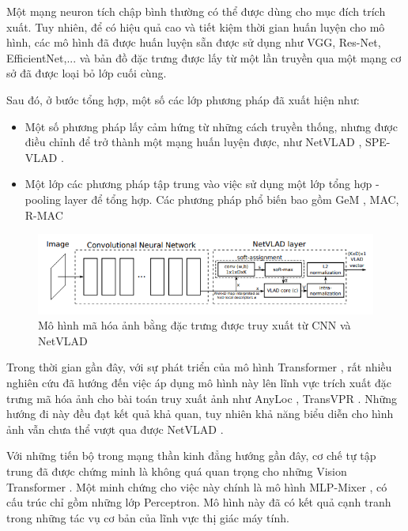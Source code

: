 Một mạng neuron tích chập bình thường có thể được dùng cho mục đích trích xuất. Tuy nhiên, để có hiệu quả cao và tiết kiệm thời gian huấn luyện cho mô hình, các mô hình đã được huấn luyện sẵn được sử dụng như VGG, Res-Net, EfficientNet,... và bản đồ đặc trưng được lấy từ một lần truyền qua một mạng cơ sở đã được loại bỏ lớp cuối cùng.

Sau đó, ở bước tổng hợp, một số các lớp phương pháp đã xuất hiện như:
\begin{itemize}
    \item Một số phương pháp lấy cảm hứng từ những cách truyền thống, nhưng được điều chỉnh để trở thành một mạng huấn luyện được, như NetVLAD \cite{arandjelovic2016netvlad}, SPE-VLAD \cite{yu2019spatial}.
    \item Một lớp các phương pháp tập trung vào việc sử dụng một lớp tổng hợp - pooling layer để tổng hợp. Các phương pháp phổ biến bao gồm GeM \cite{radenovic2018fine}, MAC, R-MAC \cite{tolias2015particular}
\end{itemize}

\begin{figure}[H]
    \centering
    \includegraphics[scale=0.8]{pics/Chapter3/netvlad.png}
    \caption{Mô hình mã hóa ảnh bằng đặc trưng được truy xuất từ CNN và  NetVLAD \cite{arandjelovic2016netvlad}}
    \label{fig:enter-label}
\end{figure}

Trong thời gian gần đây, với sự phát triển của mô hình Transformer \cite{vaswani2023attention}, rất nhiều nghiên cứu đã hướng đến việc áp dụng mô hình này lên lĩnh vực trích xuất đặc trưng mã hóa ảnh cho bài toán truy xuất ảnh như AnyLoc \cite{keetha2023anyloc}, TransVPR \cite{wang2022transvpr}. Những hướng đi này đều đạt kết quả khả quan, tuy nhiên khả năng biểu diễn cho hình ảnh vẫn chưa thể vượt qua được NetVLAD \cite{alibey2023mixvpr}.

Với những tiến bộ trong mạng thần kinh đẳng hướng gần đây, cơ chế tự tập trung đã được chứng minh là không quá quan trọng cho những Vision Transformer \cite{dosovitskiy2021image}. Một minh chứng cho việc này chính là mô hình MLP-Mixer \cite{tolstikhin2021mlpmixer}, có cấu trúc chỉ gồm những lớp Perceptron. Mô hình này đã có kết quả cạnh tranh trong những tác vụ cơ bản của lĩnh vực thị giác máy tính.

